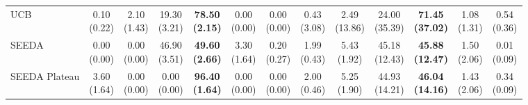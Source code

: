 \begin{table}[H]
{\begin{tabular}{l|cccccc|cccccc}
UCB & \makecell{0.10 \\ (0.22)} & \makecell{2.10 \\ (1.43)} & {\cellcolor[HTML]{C8E6C9}} \makecell{19.30 \\ (3.21)} & \bfseries \makecell{78.50 \\ (2.15)} & \makecell{0.00 \\ (0.00)} & \makecell{0.00 \\ (0.00)} & \makecell{0.43 \\ (3.08)} & \makecell{2.49 \\ (13.86)} & {\cellcolor[HTML]{C8E6C9}} \makecell{24.00 \\ (35.39)} & \bfseries \makecell{71.45 \\ (37.02)} & \makecell{1.08 \\ (1.31)} & \makecell{0.54 \\ (0.36)} \\
SEEDA & \makecell{0.00 \\ (0.00)} & \makecell{0.00 \\ (0.00)} & {\cellcolor[HTML]{C8E6C9}} \makecell{46.90 \\ (3.51)} & \bfseries \makecell{49.60 \\ (2.66)} & \makecell{3.30 \\ (1.64)} & \makecell{0.20 \\ (0.27)} & \makecell{1.99 \\ (0.43)} & \makecell{5.43 \\ (1.92)} & {\cellcolor[HTML]{C8E6C9}} \makecell{45.18 \\ (12.43)} & \bfseries \makecell{45.88 \\ (12.47)} & \makecell{1.50 \\ (2.06)} & \makecell{0.01 \\ (0.09)} \\
SEEDA Plateau & \makecell{3.60 \\ (1.64)} & \makecell{0.00 \\ (0.00)} & {\cellcolor[HTML]{C8E6C9}} \makecell{0.00 \\ (0.00)} & \bfseries \makecell{96.40 \\ (1.64)} & \makecell{0.00 \\ (0.00)} & \makecell{0.00 \\ (0.00)} & \makecell{2.00 \\ (0.46)} & \makecell{5.25 \\ (1.90)} & {\cellcolor[HTML]{C8E6C9}} \makecell{44.93 \\ (14.21)} & \bfseries \makecell{46.04 \\ (14.16)} & \makecell{1.43 \\ (2.06)} & \makecell{0.34 \\ (0.09)} \\
\bottomrule
\end{tabular}%
}
\end{table}
